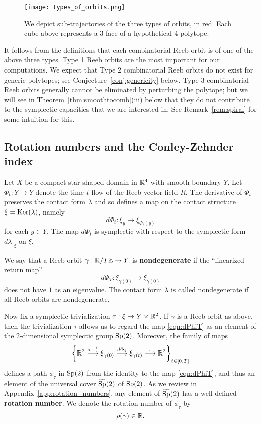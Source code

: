 \begin{figure}[h!]
\label{fig:types_of_orbits}
\texttt{[image: types\_of\_orbits.png]}
\caption{We depict sub-trajectories of the three types of orbits, in red. Each cube above represents a 3-face of a hypothetical 4-polytope.}
\end{figure}

It follows from the definitions that each combinatorial Reeb orbit is of one of the above three types. Type 1 Reeb orbits are the most important for our computations. We expect that Type 2 combinatorial Reeb orbits do not exist for generic polytopes; see Conjecture~\ref{conj:genericity} below. Type 3 combinatorial Reeb orbits generally cannot be eliminated by perturbing the polytope; but we will see in Theorem~\ref{thm:smoothtocomb}(iii) below that they do not contribute to the symplectic capacities that we are interested in. See Remark~\ref{rem:spiral} for some intuition for this.

\subsection{Rotation numbers and the Conley-Zehnder index}
\label{sec:rotcz}

Let $X$ be a compact star-shaped domain in ${\mathbb R}^4$ with smooth boundary $Y$. Let $\Phi_t:Y\to Y$ denote the time $t$ flow of the Reeb vector field $R$. The derivative of $\Phi_t$ preserves the contact form $\lambda$ and so defines a map on the contact structure $\xi = \operatorname{Ker}(\lambda)$, namely
\[
d\Phi_t:\xi_y \longrightarrow \xi_{\Phi_t(y)}
\]
for each $y\in Y$. The map $d\Phi_t$ is symplectic with respect to the symplectic form $d\lambda|_\xi$ on $\xi$.

We say that a Reeb orbit $\gamma:{\mathbb R}/T{\mathbb Z}\to Y$ is {\bf nondegenerate\/} if the ``linearized return map''
\begin{equation}
\label{eqn:dPhiT}
d\Phi_T:\xi_{\gamma(0)}\longrightarrow \xi_{\gamma(0)}
\end{equation}
does not have $1$ as an eigenvalue. The contact form $\lambda$ is called nondegenerate if all Reeb orbits are nondegenerate.

Now fix a symplectic trivialization $\tau:\xi\to Y\times{\mathbb R}^2$. If $\gamma$ is a Reeb orbit as above, then the trivialization $\tau$ allows us to regard the map \eqref{eqn:dPhiT} as an element of the $2$-dimensional symplectic group $\operatorname{Sp}(2)$. Moreover, the family of maps
\begin{equation}
\label{eqn:fom}
\left\{
{\mathbb R}^2 \stackrel{\tau^{-1}}{\longrightarrow} \xi_{\gamma(0)} \stackrel{d\Phi_t}{\longrightarrow} \xi_{\gamma(t)} \stackrel{\tau}{\longrightarrow} {\mathbb R}^2\right\}_{t\in[0,T]}
\end{equation}
defines a path $\phi_\tau$ in $\text{Sp}(2)$ from the identity to the map \eqref{eqn:dPhiT}, and thus an element of the universal cover $\widetilde{\text{Sp}}(2)$ of $\text{Sp}(2)$. As we review in Appendix~\ref{app:rotation_numbers}, any element of $\widetilde{\text{Sp}}(2)$ has a well-defined {\bf rotation number\/}. We denote the rotation number of $\phi_\tau$ by
\[
\rho(\gamma)\in{\mathbb R}.
\]

